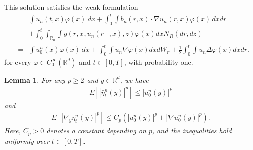 \documentclass[12pt,oneside, reqno]{amsart}
\newcommand{\be}{\begin{eqnarray}}
\newcommand{\ee}{\end{eqnarray}}
\newtheorem{lemma}[theorem]{Lemma}
\def\no{\nonumber}
\def\mR{{\mathbb R}}
\def\geq{\geqslant}
\def\leq{\leqslant}
\numberwithin{equation}{section}
\begin{document}
This solution satisfies the weak formulation
\be\label{approximation equation01}
&&\int u_n(t,x)\varphi(x)\,dx+\int_0^t\int b_n(r,x)\cdot \nabla u_n(r,x) \varphi(x)\, dx dr  \no\\
&&+\int_0^t\int _{\mR_0}\int g(r,x,u_n(r-,x),z)\varphi(x)dxN_R(dr,dz)\no\\
&=&\int u_0^n(x)\varphi(x)\,dx+\int_0^t\int   u_n \nabla\varphi(x) dx dW_r+\frac{1}{2}\int_0^t\int u_n \Delta\varphi(x) dxdr.
\ee 
for every $\varphi\in C_0^{\infty}(\mR^d)$ and $t\in[0,T]$, with probability one.





\begin{lemma}\label{Bd-nabla-eta1}
	For any $p\geq 2$ and $y\in \mR^d$, we have 
	\be\label{Bd-nabla-eta11}
	E[|\bar\eta_t^n(y)|^p]\leq |u_0^n(y)|^{p}
	\ee
	and 
	\be\label{Bd-nabla-eta12}
	E[|\nabla_y\bar\eta_t^n(y)|^p]\leq C_p(|u_0^n(y)|^{p}+|\nabla u_0^n(y)|^{p}).
	\ee
	Here, $C_p>0$ denotes a constant depending on $p$, and the inequalities hold uniformly over $t\in[0,T]$.
\end{lemma}
\end{document}
